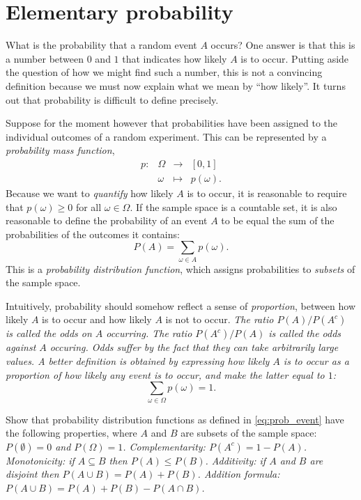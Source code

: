 
\section{Elementary probability}\label{ss:elementary}

What is the probability that a random event $A$ occurs? One answer is that this is a number between $0$ and $1$ that indicates how likely $A$ is to occur. Putting aside the question of how we might find such a number, this is not a convincing definition because we must now explain what we mean by ``how likely''. It turns out that probability is difficult to define precisely.

Suppose for the moment however that probabilities have been assigned to the individual outcomes of a random experiment. This can be represented by a \emph{probability mass function},
\[
\begin{array}{cccl}
p:	& \Omega	& \longrightarrow	& [0,1] \\
	& \omega 	& \mapsto			& p(\omega).
\end{array}
\]
Because we want to \emph{quantify} how likely $A$ is to occur, it is reasonable to require that $p(\omega)\geq 0$ for all $\omega\in\Omega$. If the sample space is a countable set, it is also reasonable to define the probability of an event $A$ to be equal the sum of the probabilities of the outcomes it contains:
\begin{equation}\label{eq:prob_event}
P(A) = \sum_{\omega\in A} p(\omega).\tag{*}
\end{equation}
This is a \emph{probability distribution function}, which assigns probabilities to \emph{subsets} of the sample space.

\bigskip
Intuitively, probability should somehow reflect a sense of \emph{proportion}, between how likely $A$ is to occur and how likely $A$ is not to occur. 
\bit
\it The ratio $P(A)/P(A^c)$ is called the \emph{odds on} $A$ occurring.
\it The ratio $P(A^c)/P(A)$ is called the \emph{odds against} $A$ occuring. 
\eit
Odds suffer by the fact that they can take arbitrarily large values. A better definition is obtained by expressing how likely $A$ is to occur as a proportion of how likely \emph{any} event is to occur, and make the latter equal to $1$:
\[
\sum_{\omega\in\Omega} p(\omega) = 1.
\]

\begin{exercise}\label{exe:elementary_properties}
Show that probability distribution functions as defined in \eqref{eq:prob_event} have the following properties, where $A$ and $B$ are subsets of the sample space:
\ben
\it $P(\emptyset)=0$ and $P(\Omega)=1$.
\it Complementarity: $P(A^c) = 1 - P(A)$.
\it Monotonicity: if $A\subseteq B$ then $P(A)\leq P(B)$.
\it Additivity: if $A$ and $B$ are disjoint then $P(A\cup B)=P(A)+P(B)$.
\it Addition formula: $P(A\cup B)=P(A)+P(B)-P(A\cap B)$.
\een
\end{exercise}

